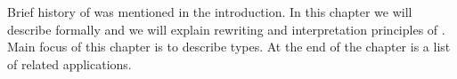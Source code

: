
\chapter{\lsystems}

Brief history of \lsystems was mentioned in the introduction.
In this chapter we will describe \lsystems formally and we will explain rewriting and interpretation principles of \lsystems.
Main focus of this chapter is to describe \lsystem types.
At the end of the chapter is a list of related applications.




\clearpage


\clearpage


































